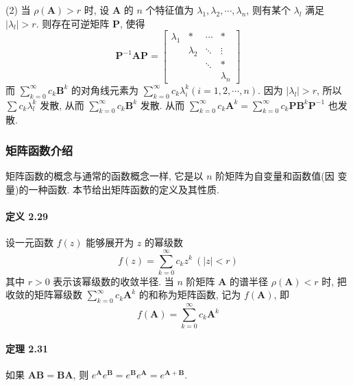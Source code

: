 \par (2) 当 $\rho(\bm{A}) > r$ 时, 设 $\bm{A}$ 的 $n$ 个特征值为 $\lambda_1, \lambda_2, \cdots, \lambda_n$, 则有某个 $\lambda_l$ 满足 $\lvert \lambda_l \rvert > r$. 则存在可逆矩阵 $\bm{P}$, 使得
$$
    \bm{P}^{-1}\bm{AP} = \begin{bmatrix}
        \lambda_1 & *         & \cdots & *         \\
                  & \lambda_2 & \ddots & \vdots    \\
                  &           & \ddots & *         \\
                  &           &        & \lambda_n
    \end{bmatrix}
$$
而 $\sum\limits_{k=0}^\infty c_k \bm{B}^k$ 的对角线元素为 $\sum\limits_{k=0}^\infty c_k \lambda_i^k (i = 1, 2, \cdots, n)$. 因为 $\lvert \lambda_l \rvert > r$, 所以 $\sum\limits c_k \lambda_l^k$ 发散, 从而 $\sum\limits_{k=0}^\infty c_k \bm{B}^k$ 发散. 从而
$\sum\limits_{k = 0}^\infty c_k\bm{A}^k = \sum\limits_{k = 0}^\infty c_k\bm{PB}^k\bm{P}^{-1}$ 也发散.

\subsubsection{矩阵函数介绍}

矩阵函数的概念与通常的函数概念一样, 它是以 $n$ 阶矩阵为自变量和函数值(因
变量)的一种函数. 本节给出矩阵函数的定义及其性质.

\paragraph*{定义 2.29} 设一元函数 $f(z)$ 能够展开为 $z$ 的幂级数
$$
    f(z) = \sum\limits_{k=0}^\infty c_k z^k \ (\lvert z \rvert < r)
$$
其中 $r > 0$ 表示该幂级数的收敛半径. 当 $n$ 阶矩阵 $\bm{A}$ 的谱半径 $\rho(\bm{A}) < r$ 时, 把收敛的矩阵幂级数 $\sum\limits_{k = 0}^{\infty} c_k \bm{A}^k$ 的和称为矩阵函数, 记为 $f(\bm{A})$, 即
$$
    f(\bm{A}) = \sum\limits_{k=0}^{\infty} c_k \bm{A}^k
$$

\paragraph*{定理 2.31} 如果 $\bm{AB} = \bm{BA}$, 则 $e^{\bm{A}}e^{\bm{B}} = e^{\bm{B}}e^{\bm{A}} = e^{\bm{A} + \bm{B}}$.

